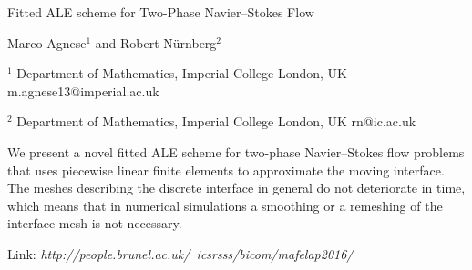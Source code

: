 \documentclass[12pt]{article}
\begin{document}
Fitted ALE scheme for Two-Phase Navier--Stokes Flow

Marco Agnese$^1$   %
and
Robert N\"urnberg$^2$

$^1$ Department of Mathematics, Imperial College London, UK
m.agnese13@imperial.ac.uk

$^2$ Department of Mathematics, Imperial College London, UK
rn@ic.ac.uk

\vspace{4mm}

\noindent%
We present a novel fitted ALE scheme for two-phase Navier--Stokes flow problems
that uses piecewise linear finite elements to approximate the moving interface.
The meshes describing the discrete interface in general do not deteriorate in
time, which means that in numerical simulations a smoothing or a remeshing of
the interface mesh is not necessary.

Link: \emph{http://people.brunel.ac.uk/~icsrsss/bicom/mafelap2016/}
\end{document}

